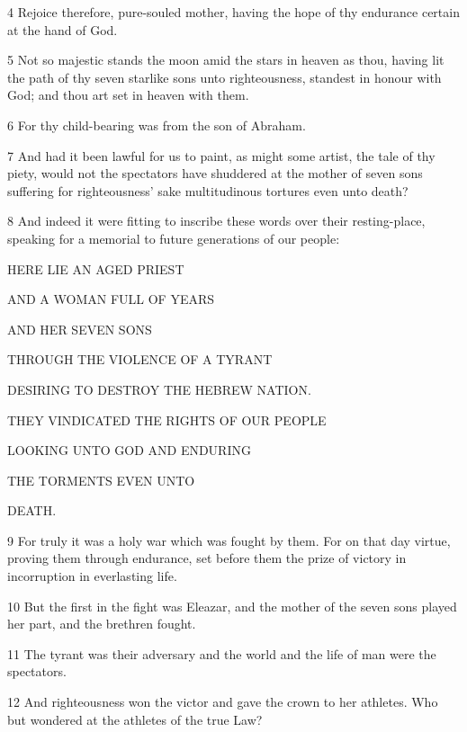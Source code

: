 \par 4 Rejoice therefore, pure-souled mother, having the hope of thy endurance certain at the hand of God.

\par 5 Not so majestic stands the moon amid the stars in heaven as thou, having lit the path of thy seven starlike sons unto righteousness, standest in honour with God; and thou art set in heaven with them.

\par 6 For thy child-bearing was from the son of Abraham.

\par 7 And had it been lawful for us to paint, as might some artist, the tale of thy piety, would not the spectators have shuddered at the mother of seven sons suffering for righteousness' sake multitudinous tortures even unto death?

\par 8 And indeed it were fitting to inscribe these words over their resting-place, speaking for a memorial to future generations of our people:

\par HERE LIE AN AGED PRIEST
\par AND A WOMAN FULL OF YEARS
\par AND HER SEVEN SONS
\par THROUGH THE VIOLENCE OF A TYRANT
\par DESIRING TO DESTROY THE HEBREW NATION.
\par THEY VINDICATED THE RIGHTS OF OUR PEOPLE
\par LOOKING UNTO GOD AND ENDURING
\par THE TORMENTS EVEN UNTO
\par DEATH.

\par 9 For truly it was a holy war which was fought by them. For on that day virtue, proving them through endurance, set before them the prize of victory in incorruption in everlasting life.

\par 10 But the first in the fight was Eleazar, and the mother of the seven sons played her part, and the brethren fought.

\par 11 The tyrant was their adversary and the world and the life of man were the spectators.

\par 12 And righteousness won the victor and gave the crown to her athletes. Who but wondered at the athletes of the true Law?

